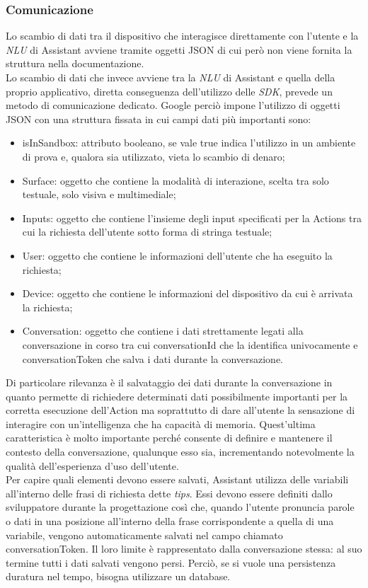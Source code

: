 		\subsubsection{Comunicazione}
		Lo scambio di dati tra il dispositivo che interagisce direttamente con l'utente e la \textit{NLU} di Assistant avviene tramite oggetti JSON di cui però non viene fornita la struttura nella documentazione. \\
		Lo scambio di dati che invece avviene tra la \textit{NLU} di Assistant e quella della proprio applicativo, diretta conseguenza dell'utilizzo delle \textit{SDK}, prevede un metodo di comunicazione dedicato. Google perciò impone l'utilizzo di oggetti JSON con una struttura fissata in cui campi dati più importanti sono:
		\begin{itemize}
			\item isInSandbox: attributo booleano, se vale true indica l'utilizzo in un ambiente di prova e, qualora sia utilizzato, vieta lo scambio di denaro;
			\item Surface: oggetto che contiene la modalità di interazione, scelta tra solo testuale, solo visiva e multimediale;
			\item Inputs: oggetto che contiene l'insieme degli input specificati per la Actions tra cui la richiesta dell'utente sotto forma di stringa testuale;
			\item User: oggetto che contiene le informazioni dell'utente che ha eseguito la richiesta;
			\item Device: oggetto che contiene le informazioni del dispositivo da cui è arrivata la richiesta;
			\item Conversation: oggetto che contiene i dati strettamente legati alla conversazione in corso tra cui conversationId che la identifica univocamente e conversationToken che salva i dati durante la conversazione.
		\end{itemize}
		Di particolare rilevanza è il salvataggio dei dati durante la conversazione in quanto permette di richiedere determinati dati possibilmente importanti per la corretta esecuzione dell'Action ma soprattutto di dare all'utente la sensazione di interagire con un'intelligenza che ha capacità di memoria. Quest'ultima caratteristica è molto importante perché consente di definire e mantenere il contesto della conversazione, qualunque esso sia, incrementando notevolmente la qualità dell'esperienza d'uso dell'utente. \\
		Per capire quali elementi devono essere salvati, Assistant utilizza delle variabili all'interno delle frasi di richiesta dette \textit{tips}. Essi devono essere definiti dallo sviluppatore durante la progettazione così che, quando l'utente pronuncia parole o dati in una posizione all'interno della frase corrispondente a quella di una variabile, vengono automaticamente salvati nel campo chiamato conversationToken. Il loro limite è rappresentato dalla conversazione stessa: al suo termine tutti i dati salvati vengono persi. Perciò, se si vuole una persistenza duratura nel tempo, bisogna utilizzare un database.
